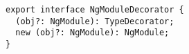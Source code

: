 \begin{verbatim}
export interface NgModuleDecorator {
  (obj?: NgModule): TypeDecorator;
  new (obj?: NgModule): NgModule;
}
\end{verbatim}
